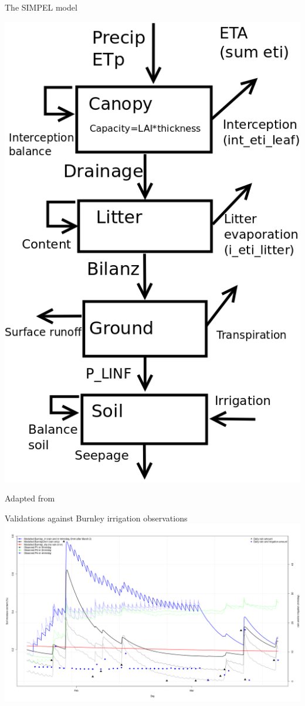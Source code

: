 \documentclass{beamer}
\begin{document}
\begin{frame}{The SIMPEL model} 

\includegraphics[scale=0.30]{Simpel_diagram2.png}

Adapted from \cite{hormann_comparison_2007}


\end{frame}



\begin{frame}{Validations against Burnley irrigation observations} 
\includegraphics[scale=0.20]{BurnleyComparisons.png}
\end{frame}
\end{document}
